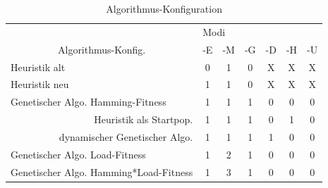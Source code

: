 	\begin{table}[htp]
		\centering
		\begin{tabular}{cccccccc}
			\multicolumn{2}{l}{}                 & \multicolumn{6}{|l}{Modi}                                                               \\ 
			\multicolumn{2}{c}{Algorithmus-Konfig.}  & \multicolumn{1}{|c}{-E} & \multicolumn{1}{c}{-M} & \multicolumn{1}{c}{-G} & \multicolumn{1}{c}{-D} & \multicolumn{1}{c}{-H} & \multicolumn{1}{c}{-U} \\ 
			\hline
		\multicolumn{2}{l}{Heuristik alt}  & \multicolumn{1}{|c}{0} & \multicolumn{1}{c}{1} & \multicolumn{1}{c}{0} & \multicolumn{1}{c}{X} & \multicolumn{1}{c}{X} & \multicolumn{1}{c}{X} \\
		\multicolumn{2}{l}{Heuristik neu}  & \multicolumn{1}{|c}{1} & \multicolumn{1}{c}{1} & \multicolumn{1}{c}{0} & \multicolumn{1}{c}{X} & \multicolumn{1}{c}{X} & \multicolumn{1}{c}{X} \\ 
		\multicolumn{2}{l}{Genetischer Algo. Hamming-Fitness}  & \multicolumn{1}{|c}{1} & \multicolumn{1}{c}{1} & \multicolumn{1}{c}{1} & \multicolumn{1}{c}{0} & \multicolumn{1}{c}{0} & \multicolumn{1}{c}{0} \\
			\multicolumn{2}{r}{Heuristik als Startpop.}  & \multicolumn{1}{|c}{1} & \multicolumn{1}{c}{1} & \multicolumn{1}{c}{1} & \multicolumn{1}{c}{0} & \multicolumn{1}{c}{1} & \multicolumn{1}{c}{0}  \\
			\multicolumn{2}{r}{dynamischer Genetischer Algo.}  & \multicolumn{1}{|c}{1} & \multicolumn{1}{c}{1} & \multicolumn{1}{c}{1} & \multicolumn{1}{c}{1} & \multicolumn{1}{c}{0} & \multicolumn{1}{c}{0} \\
		\multicolumn{2}{l}{Genetischer Algo. Load-Fitness}  & \multicolumn{1}{|c}{1} & \multicolumn{1}{c}{2} & \multicolumn{1}{c}{1} & \multicolumn{1}{c}{0} & \multicolumn{1}{c}{0} & \multicolumn{1}{c}{0}  \\ 
		\multicolumn{2}{l}{Genetischer Algo. Hamming*Load-Fitness}  & \multicolumn{1}{|c}{1} & \multicolumn{1}{c}{3} & \multicolumn{1}{c}{1} & \multicolumn{1}{c}{0} & \multicolumn{1}{c}{0} & \multicolumn{1}{c}{0}                     
		\end{tabular}
		\newline
		\caption{Algorithmus-Konfiguration}
		\label{tab:algo_conifg}
	\end{table}

